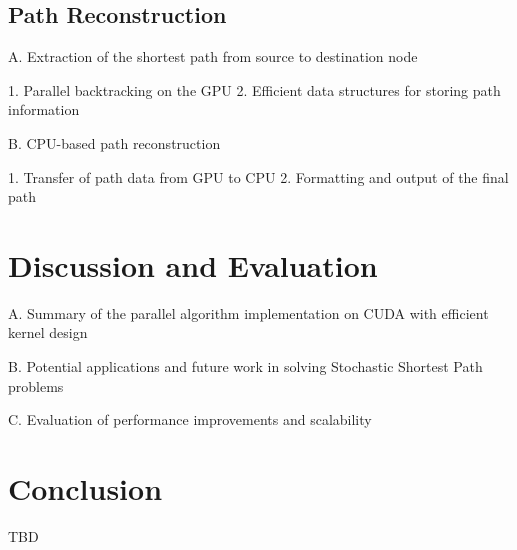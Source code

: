 \documentclass{article}
\begin{document}
\subsection{Path Reconstruction}
A. Extraction of the shortest path from source to destination node

1. Parallel backtracking on the GPU
2. Efficient data structures for storing path information

B. CPU-based path reconstruction

1. Transfer of path data from GPU to CPU
2. Formatting and output of the final path



\section{Discussion and Evaluation}
A. Summary of the parallel algorithm implementation on CUDA with efficient kernel design

B. Potential applications and future work in solving Stochastic Shortest Path problems

C. Evaluation of performance improvements and scalability
\section{Conclusion}

TBD
\end{document}

